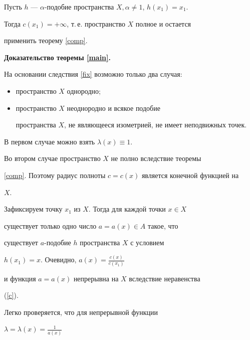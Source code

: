 \begin{pf}


Пусть $h$ --- $\alpha$-подобие пространства $X,\alpha \neq 1$, $h(x_{1})=x_{1}$.


Тогда $c(x_{1})= +\infty$, т.\,е. пространство $X$ полное и остается


применить теорему \ref{comp}.


\end{pf}





{\bf Доказательство теоремы \ref{main}.}


На основании следствия \ref{fix} возможно только два случая:


\begin{itemize}


\item[1)] пространство $X$ однородно;


\item[2)] пространство $X$ неоднородно и всякое подобие


пространства $X$, не являющееся изометрией, не имеет неподвижных точек.


\end{itemize}





В первом случае можно взять $\lambda(x) \equiv 1$.


Во втором случае пространство $X$ не полно вследствие теоремы


\ref{comp}. Поэтому радиус полноты $c = c(x)$ является конечной функцией на


$X$.





Зафиксируем точку $x_{1}$ из $X$. Тогда для каждой точки $x \in X$


существует только одно число $a = a(x) \in A$ такое, что


существует $a$-подобие $h$ пространства $X$ с условием


$h(x_{1})=x$. Очевидно, $a(x)= \frac{c(x)}{c(x_{1})}$


и функция $a= a(x)$ непрерывна на $X$ вследствие неравенства


(\ref{c}).





Легко проверяется, что для непрерывной функции


$\lambda = \lambda(x) = \frac{1}{a(x)}$



